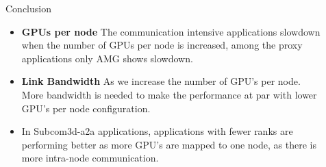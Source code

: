 \documentclass[final]{beamer}
\newlength{\sepwid}
\newlength{\onecolwid}
\newlength{\twocolwid}
\begin{document}
\begin{frame}[t]
\begin{columns}[t]
\begin{column}{\twocolwid}
\begin{columns}[t,totalwidth=\twocolwid]
\begin{column}{\onecolwid}






\end{column} %

\end{columns} %

\end{column} %

\begin{column}{\sepwid}\end{column} %

\begin{column}{\onecolwid} %


\begin{block}{Conclusion}
\begin{itemize}
\item \textbf{GPUs per node} The communication intensive applications slowdown when the number of GPUs per node is increased, among the proxy applications only AMG shows slowdown.
\vspace{\baselineskip}

\item \textbf{Link Bandwidth} As we increase the number of GPU's per node. More bandwidth is needed to make the performance at par with lower GPU's per node configuration.
\vspace{\baselineskip}
\item In Subcom3d-a2a applications, applications with fewer ranks are performing better as more GPU's are mapped to one node, as there is more intra-node communication.
\end{itemize}
\end{block}




\end{column}
\end{columns}
\end{frame}
\end{document}
